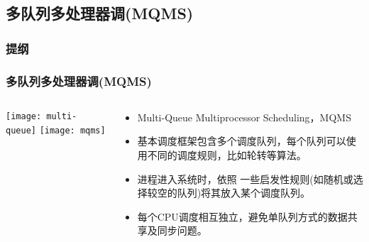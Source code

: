 \subsection{多队列多处理器调(MQMS)}
\begin{frame}
\frametitle{提纲} %
\tableofcontents %

\end{frame}
\begin{frame}
    \frametitle{多队列多处理器调(MQMS)}
	\begin{columns}
		\begin{column}{.5\textwidth}
			\Large \centering
			\texttt{[image: multi-queue]}
			\texttt{[image: mqms]}	
		\end{column}
		
		\begin{column}{.5\textwidth}
			\normalsize
			\begin{itemize}
			\item Multi-Queue Multiprocessor Scheduling，MQMS
			\item 基本调度框架包含多个调度队列，每个队列可以使用不同的调度规则，比如轮转等算法。
			
			\item 进程进入系统时，依照 一些启发性规则(如随机或选择较空的队列)将其放入某个调度队列。
			\item 每个CPU调度相互独立，避免单队列方式的数据共享及同步问题。
			\end{itemize}
		\end{column}
	\end{columns}
\end{frame}


